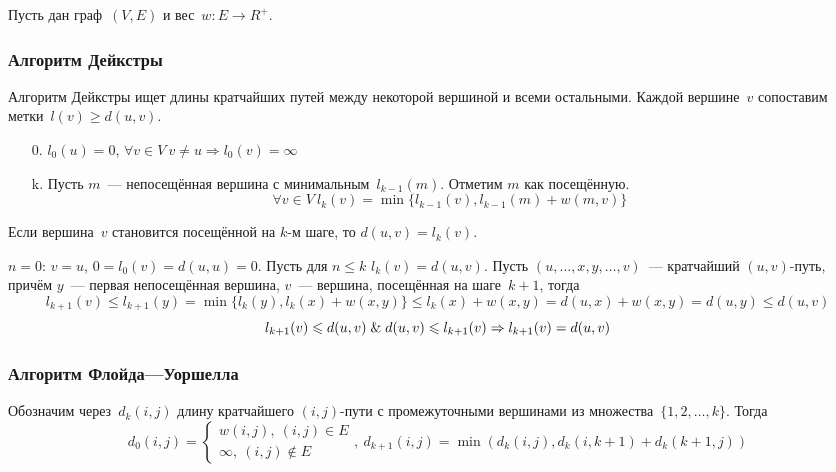 Пусть дан граф~$(V, E)$ и вес~$w \colon E \to R^+$.

\subsubsection{Алгоритм Дейкстры}
 Алгоритм Дейкстры ищет длины кратчайших путей между некоторой вершиной и всеми остальными.
Каждой вершине~$v$ сопоставим метки~$l(v) \geqslant d(u, v)$.
\begin{enumerate}
	\item[0.] $l_0(u) = 0$, $\forall v \in V \ v \neq u \Rightarrow l_0(v) = \infty$
	\item[k.] Пусть $m$~--- непосещённая вершина с минимальным~$l_{k-1}(m)$.
	Отметим $m$ как посещённую.
	\begin{equation*}
	\forall v \in V \ l_k(v) = \min \{ l_{k-1}(v), l_{k-1}(m) + w(m, v) \}
	\end{equation*}
\end{enumerate}

\begin{theorem}
Если вершина~$v$ становится посещённой на $k$-м шаге, то $d(u, v) = l_k(v)$.
\end{theorem}
\begin{proofmathind}
	\indbase $n = 0$: $v = u$, $0 = l_0(v) = d(u, u) = 0$.
	\indstep Пусть для $n \leqslant k$ $l_k(v) = d(u, v)$.
	Пусть $(u, \ldots, x, y, \ldots, v)$~--- кратчайший $(u, v)$-путь, причём $y$~--- первая непосещённая вершина, $v$~--- вершина, посещённая на шаге~$k + 1$, тогда
	\begin{equation*}
	l_{k+1}(v) \leqslant l_{k+1}(y) = \min \{ l_k(y), l_k(x) + w(x, y) \} \leqslant l_k(x) + w(x, y) = d(u, x) + w(x, y) = d(u, y) \leqslant d(u, v)
	\end{equation*}
	\begin{equation*}
	l_{k+1}(v) \leqslant d(u, v) \mathrel{\&} d(u, v) \leqslant l_{k+1}(v) \Rightarrow l_{k+1}(v) = d(u, v)
	\end{equation*}
	\indend
\end{proofmathind}

\subsubsection{Алгоритм Флойда---Уоршелла}
Обозначим через~$d_k(i, j)$ длину кратчайшего $(i, j)$-пути с промежуточными вершинами из множества~$\{ 1, 2, \ldots, k \}$.
Тогда
\begin{equation*}
d_0(i, j) =
\begin{cases}
w(i, j), \ (i, j) \in E \\
\infty, \ (i, j) \notin E
\end{cases}, \
d_{k+1}(i, j) = \min(d_k(i, j), d_k(i, k + 1) + d_k(k + 1, j))
\end{equation*}